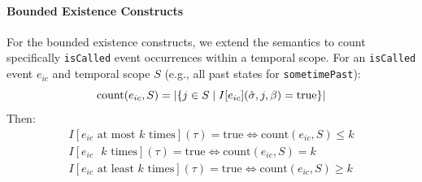 \paragraph{Bounded Existence Constructs}
For the bounded existence constructs, we extend the semantics to count specifically \texttt{isCalled} event 
occurrences within a temporal scope. For an \texttt{isCalled} event $e_{ic}$ and temporal scope $S$ 
(e.g., all past states for \texttt{sometimePast}):
\begin{equation}
\text{count}(e_{ic}, S) = |\{j \in S \mid I[e_{ic}](\hat{\sigma}, j, \beta) = \text{true}\}|
\vspace{-1em}
\end{equation}
Then:
\begin{equation}
\begin{split}
I[e_{ic} \text{ at most } k \text{ times}](\tau) = \text{true} \iff \text{count}(e_{ic}, S) \leq k \\
I[e_{ic} \text{  } k \text{ times}](\tau) = \text{true} \iff \text{count}(e_{ic}, S) = k \\
I[e_{ic} \text{ at least } k \text{ times}](\tau) = \text{true} \iff \text{count}(e_{ic}, S) \geq k
\end{split}
\end{equation}

